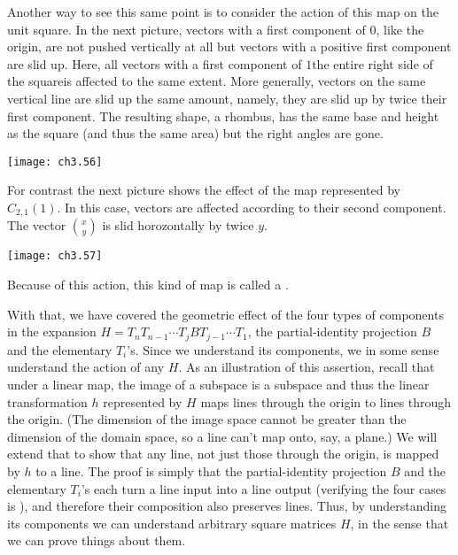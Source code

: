 Another way to see this same point is to consider the action of this map 
on the unit square.
In the next picture,
vectors with a first component of $0$, like the origin, are not pushed 
vertically at all but vectors with a positive first component are slid up.
Here, all vectors with a first component of $1$\Dash the entire 
right side of the square\Dash is affected to the same extent.
More generally, vectors on the same vertical line are slid up the same amount,
namely, they are slid up by twice their first component.
The resulting shape, a rhombus, has the same base and height as the square
(and thus the same area) but the right angles are gone.
\begin{center}
  \texttt{[image: ch3.56]}
\end{center}
For contrast the next picture shows the effect of the map represented by 
$C_{2,1}(1)$.
In this case, vectors are affected according to their  
second component.
The vector $\binom{x}{y}$ is slid horozontally by twice $y$.
\begin{center}
  \texttt{[image: ch3.57]}
\end{center}
Because of this action, this kind of map is called a 
.

With that, we have covered the geometric effect of the four types 
of components in the expansion
$H=T_nT_{n-1}\cdots T_jBT_{j-1}\cdots T_1$,
the partial-identity projection $B$ and the elementary $T_i$'s.
Since we understand its components, we in some sense 
understand the action of any $H$.
As an illustration of this assertion, 
recall that under a linear map, the image of a subspace is a subspace
and thus the linear transformation $h$ represented by $H$ maps lines 
through the origin to lines through the origin.
(The dimension of the image space cannot be greater than 
the dimension of the domain space, so a line can't map onto, say, a plane.)
We will extend that to show that any line, 
not just those through the origin, 
is mapped by $h$ to a line.
The proof is simply
that the partial-identity projection $B$ and the elementary $T_i$'s
each turn a line input into a line output 
(verifying the four cases is ),
and therefore their composition also preserves lines.
Thus, by understanding its components we can understand arbitrary square 
matrices $H$, in the sense that we can prove things about them.

